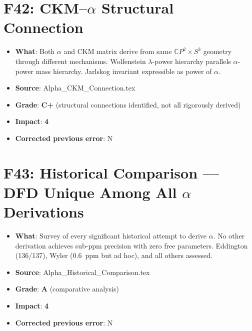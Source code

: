 \documentclass[11pt,a4paper]{article}
\newcommand{\grade}[1]{\textbf{#1}}
\newcommand{\impact}[1]{\textbf{#1}}
\begin{document}
\section{F42: CKM--$\alpha$ Structural Connection}
\begin{itemize}[nosep]
\item \textbf{What}: Both $\alpha$ and CKM matrix derive from same $\mathbb{C}P^2 \times S^3$ geometry through different mechanisms. Wolfenstein $\lambda$-power hierarchy parallels $\alpha$-power mass hierarchy. Jarlskog invariant expressible as power of $\alpha$.
\item \textbf{Source}: Alpha\_CKM\_Connection.tex
\item \textbf{Grade}: \grade{C+} (structural connections identified, not all rigorously derived)
\item \textbf{Impact}: \impact{4}
\item \textbf{Corrected previous error}: N
\end{itemize}

\section{F43: Historical Comparison --- DFD Unique Among All $\alpha$ Derivations}
\begin{itemize}[nosep]
\item \textbf{What}: Survey of every significant historical attempt to derive $\alpha$. No other derivation achieves sub-ppm precision with zero free parameters. Eddington (136/137), Wyler (0.6~ppm but ad hoc), and all others assessed.
\item \textbf{Source}: Alpha\_Historical\_Comparison.tex
\item \textbf{Grade}: \grade{A} (comparative analysis)
\item \textbf{Impact}: \impact{4}
\item \textbf{Corrected previous error}: N
\end{itemize}

\end{document}
